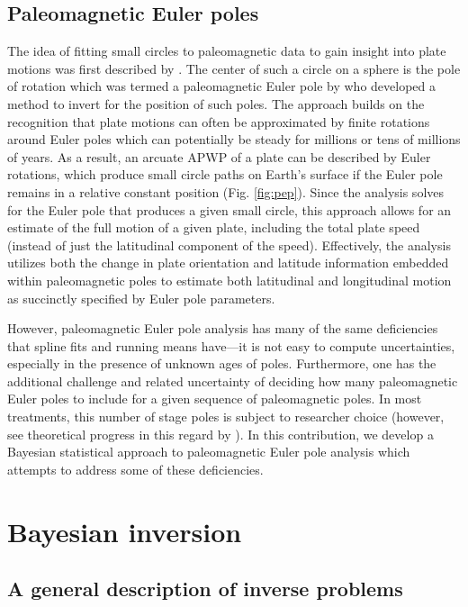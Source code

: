 \documentclass[11pt,letterpaper]{article}
\begin{document}
\subsection*{Paleomagnetic Euler poles}
The idea of fitting small circles to paleomagnetic data to gain insight into plate motions was first described by \cite{Francheteau1969a}. The center of such a circle on a sphere is the pole of rotation which was termed a paleomagnetic Euler pole by \cite{Gordon1984a} who developed a method to invert for the position of such poles. The approach builds on the recognition that plate motions can often be approximated by finite rotations around Euler poles which can potentially be steady for millions or tens of millions of years. As a result, an arcuate APWP of a plate can be described by Euler rotations, which produce small circle paths on Earth's surface if the Euler pole remains in a relative constant position (Fig. \ref{fig:pep}). Since the analysis solves for the Euler pole that produces a given small circle, this approach allows for an estimate of the full motion of a given plate, including the total plate speed (instead of just the latitudinal component of the speed). Effectively, the analysis utilizes both the change in plate orientation and latitude information embedded within paleomagnetic poles to estimate both latitudinal and longitudinal motion as succinctly specified by Euler pole parameters.

However, paleomagnetic Euler pole analysis has many of the same deficiencies that spline fits and running means have---it is not easy to compute uncertainties, especially in the presence of unknown ages of poles. Furthermore, one has the additional challenge and related uncertainty of deciding how many paleomagnetic Euler poles to include for a given sequence of paleomagnetic poles. In most treatments, this number of stage poles is subject to researcher choice (however, see theoretical progress in this regard by \citet{Gallo2022a}). In this contribution, we develop a Bayesian statistical approach to paleomagnetic Euler pole analysis which attempts to address some of these deficiencies.

\section*{Bayesian inversion}
\subsection*{A general description of inverse problems}
\end{document}
